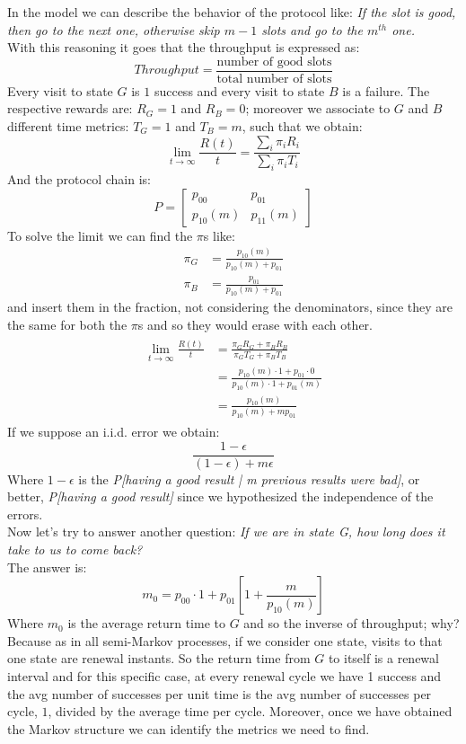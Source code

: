 \documentclass[a4paper, 12pt, openright]{book}
\theoremstyle{theoremdd}
\theoremstyle{remark}
\def \beq {\begin{equation}}
\def\eeq{\end{equation}}
\begin{document}
In the model we can describe the behavior of the protocol like: \textit{If the slot is good, then go to the next one, otherwise skip $m-1$ slots and go to the $m^{th}$ one.}\\
With this reasoning it goes that the throughput is expressed as:
\beq
Throughput = \frac{\text{number of good slots}}{\text{total number of slots}}
\eeq
Every visit to state $G$ is $1$ success and every visit to state $B$ is a failure. The respective rewards are: $R_G = 1$ and $R_B = 0$; moreover we associate to $G$ and $B$ different time metrics: $T_{G} = 1$ and $T_{B} = m$, such that we obtain:
\beq
\lim_{t \to \infty}\frac{R(t)}{t} = \frac{\sum_i\pi_iR_i}{\sum_i\pi_iT_i}
\eeq 
And the protocol chain is:
\beq
P = 
\begin{bmatrix}
p_{00} & p_{01}\\
p_{10}(m) & p_{11}(m)
\end{bmatrix}
\eeq
To solve the limit we can find the $\pi$s like:
\begin{align}
\pi_{G} & = \frac{p_{10}(m)}{p_{10}(m)+p_{01}}\\
\pi_{B} & = \frac{p_{01}}{p_{10}(m)+p_{01}}
\end{align}
and insert them in the fraction, not considering the denominators, since they are the same for both the $\pi$s and so they would erase with each other.
\begin{align}
\begin{split}
\lim_{t \to \infty}\frac{R(t)}{t} & = \frac{\pi_GR_G+\pi_BR_B}{\pi_GT_G +\pi_BT_B}\\
& = \frac{p_{10}(m)\cdot1+p_{01}\cdot0}{p_{10}(m)\cdot1+p_{01}(m)}\\
& =\frac{p_{10}(m)}{p_{10}(m)+mp_{01}}
\end{split}
\end{align}
If we suppose an i.i.d. error we obtain:
\beq
\frac{1-\epsilon}{(1-\epsilon)+m\epsilon}
\eeq
Where $1-\epsilon$ is the \textit{P[having a good result | m previous results were bad]}, or better, \textit{P[having a good result]} since we hypothesized the independence of the errors.\\
Now let's try to answer another question: \textit{If we are in state G, how long does it take to us to come back?}\\
The answer is: 
\beq
m_0 = p_{00}\cdot1+p_{01}[1+\frac{m}{p_{10}(m)}]
\label{Formula}
\eeq
Where $m_0$ is the average return time to $G$ and so the inverse of throughput; why? Because as in all semi-Markov processes, if we consider one state, visits to that one state are renewal instants. So the return time from $G$ to itself is a renewal interval and for this specific case, at every renewal cycle we have 1 success and the avg number of successes per unit time is the avg number of successes per cycle, $1$, divided by the average time per cycle. Moreover, once we have obtained the Markov structure we can identify the metrics we need to find.\\
\end{document}
